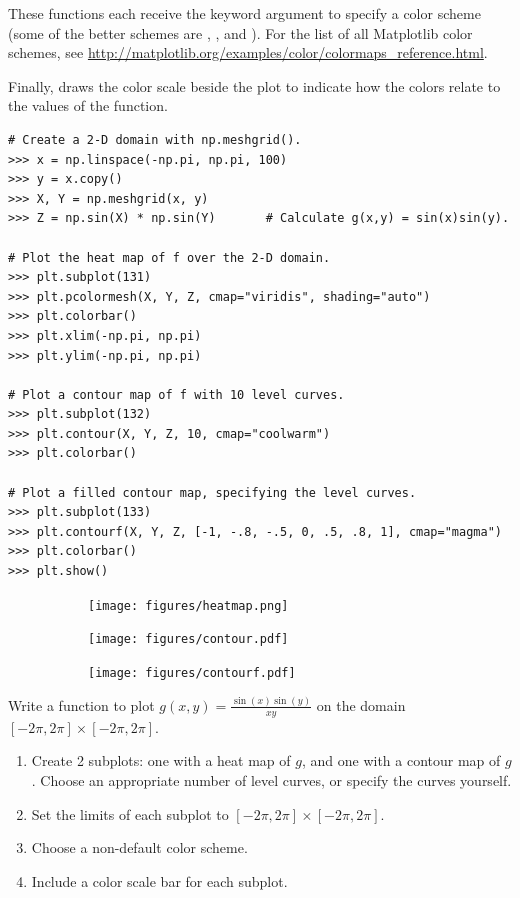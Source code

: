 These functions each receive the keyword argument  to specify a color scheme (some of the better schemes are , , and ).
For the list of all Matplotlib color schemes, see \url{http://matplotlib.org/examples/color/colormaps_reference.html}.

Finally,  draws the color scale beside the plot to indicate how the colors relate to the values of the function.

\begin{lstlisting}
# Create a 2-D domain with np.meshgrid().
>>> x = np.linspace(-np.pi, np.pi, 100)
>>> y = x.copy()
>>> X, Y = np.meshgrid(x, y)
>>> Z = np.sin(X) * np.sin(Y)       # Calculate g(x,y) = sin(x)sin(y).

# Plot the heat map of f over the 2-D domain.
>>> plt.subplot(131)
>>> plt.pcolormesh(X, Y, Z, cmap="viridis", shading="auto")
>>> plt.colorbar()
>>> plt.xlim(-np.pi, np.pi)
>>> plt.ylim(-np.pi, np.pi)

# Plot a contour map of f with 10 level curves.
>>> plt.subplot(132)
>>> plt.contour(X, Y, Z, 10, cmap="coolwarm")
>>> plt.colorbar()

# Plot a filled contour map, specifying the level curves.
>>> plt.subplot(133)
>>> plt.contourf(X, Y, Z, [-1, -.8, -.5, 0, .5, .8, 1], cmap="magma")
>>> plt.colorbar()
>>> plt.show()
\end{lstlisting}

\begin{figure}[H] %
\captionsetup[subfigure]{justification=centering}
\centering
\begin{framed}
\begin{subfigure}{.33\textwidth}
    \centering
    \texttt{[image: figures/heatmap.png]}
\end{subfigure}%
\begin{subfigure}{.33\textwidth}
    \centering
    \texttt{[image: figures/contour.pdf]}
\end{subfigure}%
\begin{subfigure}{.33\textwidth}
    \centering
    \texttt{[image: figures/contourf.pdf]}
\end{subfigure}
\end{framed}
\end{figure}

\begin{problem} %
\label{prob:heatmap}
Write a function to plot $g(x,y) = \frac{\sin(x)\sin(y)}{xy}$ on the domain $[-2\pi,2\pi] \times [-2\pi,2\pi]$.

\begin{enumerate}
\item Create 2 subplots: one with a heat map of $g$, and one with a contour map of $g$.
Choose an appropriate number of level curves, or specify the curves yourself.
\item Set the limits of each subplot to $[-2\pi,2\pi] \times [-2\pi,2\pi]$.
\item Choose a non-default color scheme.
\item Include a color scale bar for each subplot.
\end{enumerate}
\end{problem}

